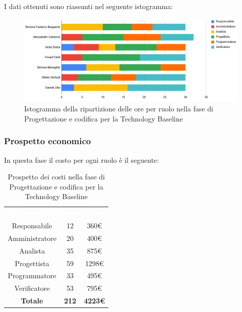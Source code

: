 I dati ottenuti sono riassunti nel seguente istogramma:
\begin{figure}[H]
\centering
\includegraphics[scale=0.60]{img/grafici/tabella_fase_prog_architetturale.png}
\caption{Istogramma della ripartizione delle ore per ruolo nella fase di Progettazione e codifica per la Technology Baseline}
\end{figure}
 
\subsubsection{Prospetto economico}
In questa fase il costo per ogni ruolo è il seguente:
 
\begin{table}[H]
\centering\renewcommand{\arraystretch}{1.5}
\caption{Prospetto dei costi nella fase di Progettazione e codifica per la Technology Baseline}
\vspace{0.2cm}
\begin{tabular}{ c c c }
\rowcolor{redafk}
\textcolor{white}{\textbf{Ruolo}} & \textcolor{white}{\textbf{Ore}} &
\textcolor{white}{\textbf{Costo}}  \\
Responsabile & 12 & 360€ \\
Amministratore & 20 & 400€ \\
Analista & 35 & 875€ \\
Progettista & 59 & 1298€ \\
Programmatore & 33 & 495€  \\
Verificatore & 53 & 795€  \\
\rowcolor{lastrowcolor}
\textbf{Totale} & \textbf{212} & \textbf{4223€}  \\
\end{tabular}
\end{table}
 
